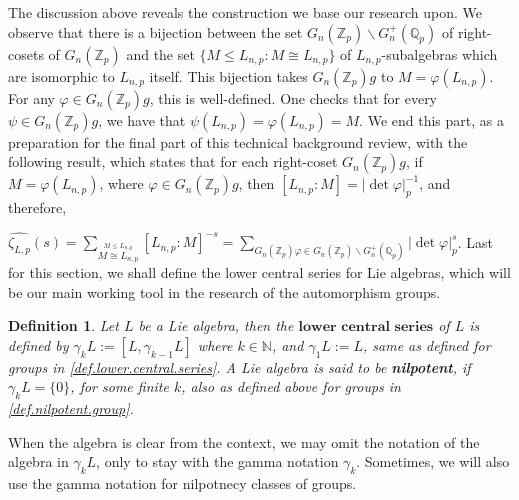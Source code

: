 \documentclass[12pt]{article}
\newtheorem{definition}[theorem]{Definition}
\begin{document}
The discussion above reveals the construction we base our research upon.
We observe that there is a bijection between the set $G_n(\mathbb{Z}_p)\backslash G^+_n(\mathbb{Q}_p)$ of right-cosets of $G_n(\mathbb{Z}_p)$ and the set $\{M\leq L_{n,p} : M\cong L_{n,p}\}$ of $L_{n,p}$-subalgebras which are isomorphic to $L_{n,p}$ itself. This bijection takes $G_n(\mathbb{Z}_p)g$ to $M=\varphi(L_{n,p})$. For any $\varphi\in G_n(\mathbb{Z}_p)g$, this is well-defined. One checks that for every $\psi\in G_n(\mathbb{Z}_p)g$, we have that $\psi(L_{n,p})=\varphi(L_{n,p})=M$.
We end this part, as a preparation for the final part of this technical background review, with the following result, which states that for each right-coset $G_n(\mathbb{Z}_p)g$, if $M=\varphi(L_{n,p})$, where $\varphi\in G_n(\mathbb{Z}_p)g$, then $[L_{n,p}:M]=|\det\varphi|_p^{-1}$, and therefore,\par $\hat{\zeta_{L,p}}(s)=\underset{\overset{\scriptscriptstyle M\leq L_{n,p}}{\scriptscriptstyle M\cong L_{n,p}}}{\sum}[L_{n,p}:M]^{-s}=\underset{\scriptscriptstyle G_n(\mathbb{Z}_p)\varphi\in G_n(\mathbb{Z}_p)\backslash G^+_n(\mathbb{Q}_p)}{\sum}|\det\varphi|_p^s$.
Last for this section, we shall define the lower central series for Lie algebras, which will be our main working tool in the research of the automorphism groups.
\begin{definition}
Let $L$ be a Lie algebra, then the $\textbf{lower central series}$ of $L$ is defined by $\gamma_k L:=[L,\gamma_{k-1}L]$ where $k\in\mathbb{N}$, and $\gamma_1 L:=L$, same as defined for groups in \ref{def.lower.central.series}. A Lie algebra is said to be \textbf{nilpotent}, if $\gamma_k L=\{0\}$, for some finite $k$, also as defined above for groups in \ref{def.nilpotent.group}.
\end{definition}
When the algebra is clear from the context, we may omit the notation of the algebra in $\gamma_k L$, only to stay with the gamma notation $\gamma_k$. Sometimes, we will also use the gamma notation for nilpotnecy classes of groups.
\end{document}
